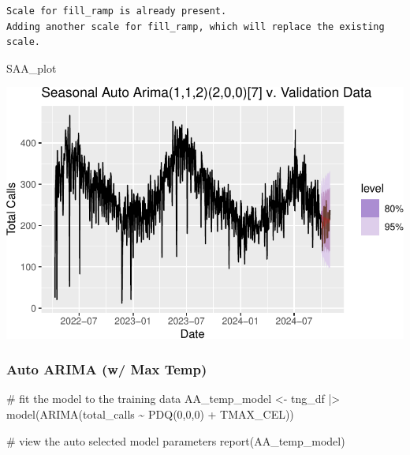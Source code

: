 \documentclass[
  letterpaper,
  DIV=11,
  numbers=noendperiod]{scrartcl}
\newenvironment{Shaded}{\begin{snugshade}}{\end{snugshade}}
\newcommand{\CommentTok}[1]{\textcolor[rgb]{0.37,0.37,0.37}{#1}}
\newcommand{\DecValTok}[1]{\textcolor[rgb]{0.68,0.00,0.00}{#1}}
\newcommand{\FunctionTok}[1]{\textcolor[rgb]{0.28,0.35,0.67}{#1}}
\newcommand{\NormalTok}[1]{\textcolor[rgb]{0.00,0.23,0.31}{#1}}
\newcommand{\OtherTok}[1]{\textcolor[rgb]{0.00,0.23,0.31}{#1}}
\newcommand{\SpecialCharTok}[1]{\textcolor[rgb]{0.37,0.37,0.37}{#1}}
\begin{document}
\begin{verbatim}
Scale for fill_ramp is already present.
Adding another scale for fill_ramp, which will replace the existing scale.
\end{verbatim}

\begin{Shaded}
\begin{Highlighting}[]
\NormalTok{SAA\_plot}
\end{Highlighting}
\end{Shaded}

\includegraphics{final_proj_group1_files/figure-pdf/unnamed-chunk-14-1.pdf}

\subsubsection{Auto ARIMA (w/ Max Temp)}\label{auto-arima-w-max-temp}

\begin{Shaded}
\begin{Highlighting}[]
\CommentTok{\# fit the model to the training data}
\NormalTok{AA\_temp\_model }\OtherTok{\textless{}{-}}\NormalTok{ tng\_df }\SpecialCharTok{|\textgreater{}}
  \FunctionTok{model}\NormalTok{(}\FunctionTok{ARIMA}\NormalTok{(total\_calls }\SpecialCharTok{\textasciitilde{}} \FunctionTok{PDQ}\NormalTok{(}\DecValTok{0}\NormalTok{,}\DecValTok{0}\NormalTok{,}\DecValTok{0}\NormalTok{) }\SpecialCharTok{+} 
\NormalTok{                TMAX\_CEL))}

\CommentTok{\# view the auto selected model parameters}
\FunctionTok{report}\NormalTok{(AA\_temp\_model)}
\end{Highlighting}
\end{Shaded}
\end{document}
